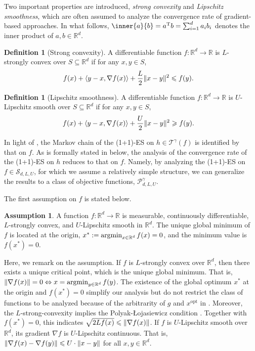 \documentclass[journal]{IEEEtran}
\providecommand{\argmin}{\operatornamewithlimits{argmin}} %
\providecommand{\R}{\mathbb{R}} %
\providecommand{\T}{\mathrm{T}} %
\renewcommand{\geq}{\geqslant} %
\renewcommand{\leq}{\leqslant} %
\DeclarePairedDelimiter{\norm}{\lVert}{\rVert}
\theoremstyle{definition}
\newtheorem{definition}[]{Definition}
\newtheorem{assumption}[]{Assumption}
\begin{document}
Two important properties are introduced, \emph{strong convexity} and \emph{Lipschitz smoothness}, which are often assumed to analyze the convergence rate of gradient-based approaches.
In what follows, $\inner{a}{b} = a^\T b = \sum_{i=1}^{d} a_i b_i$ denotes the inner product of $a, b \in \R^d$. 
\begin{definition}[Strong convexity]
A differentiable function $f:\R^d\to \R$ is $L$-strongly convex over $S\subseteq\R^d$ if for any $x, y \in S$,
\begin{equation}
f(x) + \langle y-x, \nabla f(x) \rangle + \frac{L}{2}\norm{x-y}^2 \leq f(y)
    .
\end{equation}
\end{definition}
\begin{definition}[Lipschitz smoothness]
A differentiable function $f:\R^d\to\R$ is $U$-Lipschitz smooth over $S\subseteq\R^d$ if for any $x, y \in S$,
\begin{equation}
f(x) + \langle y-x, \nabla f(x) \rangle + \frac{U}{2}\norm{x-y}^2 \geq f(y)
    .
\end{equation}
\end{definition}
In light of , the Markov chain of the (1+1)-ES on $h \in \mathcal{T}^{\gamma}(f)$ is identified by that on $f$.
As is formally stated in  below, the analysis of the convergence rate of the (1+1)-ES on $h$ reduces to that on $f$. 
Namely, by analyzing the (1+1)-ES on $f \in \mathcal{S}_{d,L,U}$, for which we assume a relatively simple structure, we can generalize the results to a class of objective functions, $\mathcal{P}_{d, L, U}^{\gamma}$.

The first assumption on $f$ is stated below.
\begin{assumption}\label{asm:L_U_2diff}
A function $f:\R^d \to \R$ is measurable, continuously differentiable, $L$-strongly convex, and $U$-Lipschitz smooth in $\R^d$. 
The unique global minimum of $f$ is located at the origin, $x^* := \argmin_{x\in \R^d} f(x) = 0$, and the minimum value is $f(x^*) = 0$.
\end{assumption}
Here, we remark on the assumption.
If $f$ is $L$-strongly convex over $\R^d$, then there exists a unique critical point, which is the unique global minimum. 
That is, $\norm{\nabla f(x)}=0 \Leftrightarrow x=\argmin_{y \in \R^d} f(y)$. 
The existence of the global optimum $x^*$ at the origin and $f(x^*) = 0$ simplify our analysis but do not restrict the class of functions to be analyzed because of the arbitrarity of $g$ and $x^\mathrm{opt}$ in .
Moreover, the $L$-strong-convexity implies the Polyak-{\L}ojasiewicz condition \cite{Karimi2016}. Together with $f(x^*) = 0$, this indicates $\sqrt{2 L f(x)} \leq \norm{\nabla f(x)}$.
If $f$ is $U$-Lipschitz smooth over $\R^d$, its gradient $\nabla f$ is $U$-Lipschitz continuous. That is, $\norm{\nabla f(x) - \nabla f(y)}\leq U\cdot \norm{x-y}$ for all $x, y\in \R^d$.
\end{document}
